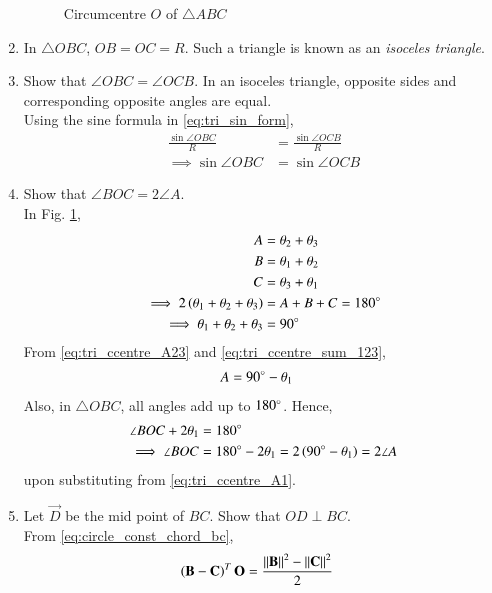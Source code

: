 \begin{enumerate}[label=\arabic*.,ref=\thesubsection.\theenumi]
\begin{figure}[!ht]
\begin{center}
		\resizebox{\columnwidth}{!}{}
	\end{center}
	\caption{Circumcentre $O$ of $\triangle ABC$}
	\label{fig:tri_ccentre}	
\end{figure}
%
\item In $\triangle OBC$, $OB = OC = R$.  Such a triangle is known as an {\em isoceles triangle}.
%
\item Show that $\angle OBC = \angle OCB$.  In an isoceles triangle, opposite sides and corresponding opposite angles are equal.
\label{prob:tri_ang_side_eq}
\\
\solution Using the sine formula in \eqref{eq:tri_sin_form},%
\begin{align}
\frac{\sin \angle OBC}{R} &= \frac{\sin \angle OCB}{R}
\\
\implies \sin \angle OBC &= \sin \angle OCB
\end{align}
%
\item  Show that $\angle BOC = 2\angle A$.
%
\\
\solution In Fig. \ref{fig:tri_ccentre}, 
%
\begin{align}
%
\label{eq:tri_ccentre_A23}
A &= \theta_2+\theta_3
\\
B &= \theta_1+\theta_2
\\
C &= \theta_3+\theta_1
\\
\implies 2\brak{\theta_1+\theta_2+\theta_3} &= A+B+C =180\degree
\\
\implies \theta_1+\theta_2+\theta_3 &= 90\degree
\label{eq:tri_ccentre_sum_123}
\end{align}
%
From \eqref{eq:tri_ccentre_A23} and \eqref{eq:tri_ccentre_sum_123},
%
\begin{align}
%
\label{eq:tri_ccentre_A1}
A &= 90\degree - \theta_1
\end{align}
%
Also, in $\triangle OBC$, all angles add up to $180\degree$.  Hence, 
%
\begin{align}
\angle BOC + 2\theta_1 &= 180\degree
\\
\implies \angle BOC &= 180\degree - 2\theta_1 = 2 \left(90\degree - \theta_1\right)
= 2\angle A
\end{align}
%
upon substituting from \eqref{eq:tri_ccentre_A1}.
%
\item Let $\vec{D}$ be the mid point of $BC$.  Show that $OD \perp BC$.
%
\\
\solution From \eqref{eq:circle_const_chord_bc}, 
%
\begin{align}
\brak{\vec{B}-\vec{C}}^T\vec{O} &=   \frac{\norm{\vec{B}}^2- \norm{\vec{C}}^2}{2}

\end{align}
\end{enumerate}
